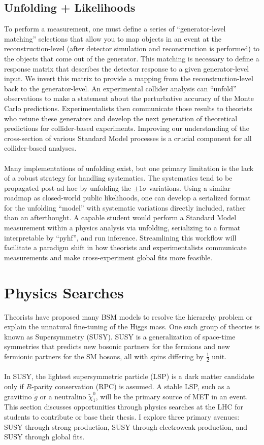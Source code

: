 \documentclass[10pt,a4paper,sans]{moderncv} %
\begin{document}
\subsection{Unfolding + Likelihoods}
To perform a measurement, one must define a series of ``generator-level matching'' selections that allow you to map objects in an event at the reconstruction-level (after detector simulation and reconstruction is performed) to the objects that come out of the generator. This matching is necessary to define a response matrix that describes the detector response to a given generator-level input. We invert this matrix to provide a mapping from the reconstruction-level back to the generator-level. An experimental collider analysis can ``unfold'' observations to make a statement about the perturbative accuracy of the Monte Carlo predictions. Experimentalists then communicate those results to theorists who retune these generators and develop the next generation of theoretical predictions for collider-based experiments. Improving our understanding of the cross-section of various Standard Model processes is a crucial component for all collider-based analyses.
\\
\\
Many implementations of unfolding exist, but one primary limitation is the lack of a robust strategy for handling systematics. The systematics tend to be propagated post-ad-hoc by unfolding the $\pm 1 \sigma$ variations. Using a similar roadmap as closed-world public likelihoods, one can develop a serialized format for the unfolding ``model''  with systematic variations directly included, rather than an afterthought. A capable student would perform a Standard Model measurement within a physics analysis via unfolding, serializing to a format interpretable by ``pyhf'', and run inference. Streamlining this workflow will facilitate a paradigm shift in how theorists and experimentalists communicate measurements and make cross-experiment global fits more feasible.

\section{Physics Searches}
Theorists have proposed many BSM models to resolve the hierarchy problem or explain the unnatural fine-tuning of the Higgs mass. One such group of theories is known as Supersymmetry (SUSY). SUSY is a generalization of space-time symmetries that predicts new bosonic partners for the fermions and new fermionic partners for the SM bosons, all with spins differing by $\frac{1}{2}$ unit.
\\
\\
In SUSY, the lightest supersymmetric particle (LSP) is a dark matter candidate only if $R$-parity conservation (RPC) is assumed. A stable LSP, such as a gravitino $\tilde{g}$ or a neutralino $\tilde{\chi}_1^0$, will be the primary source of MET in an event. This section discusses opportunities through physics searches at the LHC for students to contribute or base their thesis. I explore three primary avenues: SUSY through strong production, SUSY through electroweak production, and SUSY through global fits.
\end{document}
